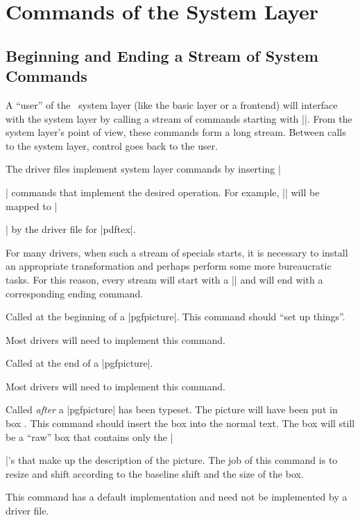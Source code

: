 %
%
%


\section[pgfsys-commands]{Commands of the System Layer}

\makeatletter

\subsection{Beginning and Ending a Stream of System Commands}

A ``user'' of the \pgfname\ system layer (like the basic layer or a frontend)
will interface with the system layer by calling a stream of commands starting
with |\pgfsys@|. From the system layer's point of view, these commands form a
long stream. Between calls to the system layer, control goes back to the user.

The driver files implement system layer commands by inserting |\special|
commands that implement the desired operation. For example, |\pgfsys@stroke|
will be mapped to || by the driver file for |pdftex|.

For many drivers, when such a stream of specials starts, it is necessary to
install an appropriate transformation and perhaps perform some more
bureaucratic tasks. For this reason, every stream will start with a
|\pgfsys@beginpicture| and will end with a corresponding ending command.

\begin{command}{\pgfsys@beginpicture}
    Called at the beginning of a |{pgfpicture}|. This command should ``set up
    things''.

    Most drivers will need to implement this command.
\end{command}

\begin{command}{\pgfsys@endpicture}
  Called at the end of a |{pgfpicture}|.

  Most drivers will need to implement this command.
\end{command}

\begin{command}{\pgfsys@typesetpicturebox{}}
    Called \emph{after} a |{pgfpicture}| has been typeset. The picture will
    have been put in box . This command should insert the box into
    the normal text. The box  will still be a ``raw'' box that
    contains only the |\special|'s that make up the description of the picture.
    The  job of this command is to resize and shift  according to the
    baseline shift and the size of the box.

    This command has a default implementation and need not be implemented by a
    driver file.
\end{command}

